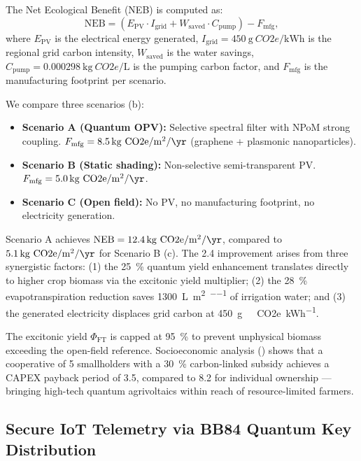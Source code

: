 \documentclass[twocolumn]{article}
\begin{document}
The Net Ecological Benefit (NEB) is computed as:
\begin{equation}
\mathrm{NEB} = \left( E_{\mathrm{PV}} \cdot I_{\mathrm{grid}} + W_{\mathrm{saved}} \cdot C_{\mathrm{pump}} \right) - F_{\mathrm{mfg}},
\label{eq:neb}
\end{equation}
where $E_{\mathrm{PV}}$ is the electrical energy generated, $I_{\mathrm{grid}} = \SI{450}{\g\ CO2e\per\kWh}$ is the regional grid carbon intensity, $W_{\mathrm{saved}}$ is the water savings, $C_{\mathrm{pump}} = \SI{0.000298}{\kg\ CO2e\per\L}$ is the pumping carbon factor, and $F_{\mathrm{mfg}}$ is the manufacturing footprint per scenario.

We compare three scenarios (b):
\begin{itemize}
\item \textbf{Scenario A (Quantum OPV):} Selective spectral filter with NPoM strong coupling. $F_{\mathrm{mfg}} = \SI{8.5}{\kg\ CO2e\per\m\squared\per\yr}$ (graphene + plasmonic nanoparticles).
\item \textbf{Scenario B (Static shading):} Non-selective semi-transparent PV. $F_{\mathrm{mfg}} = \SI{5.0}{\kg\ CO2e\per\m\squared\per\yr}$.
\item \textbf{Scenario C (Open field):} No PV, no manufacturing footprint, no electricity generation.
\end{itemize}

Scenario A achieves $\mathrm{NEB} = \SI{12.4}{\kg\ CO2e\per\m\squared\per\yr}$, compared to $\SI{5.1}{\kg\ CO2e\per\m\squared\per\yr}$ for Scenario B (c).
The \SI{2.4}{\times} improvement arises from three synergistic factors: (1) the \SI{25}{\percent} quantum yield enhancement translates directly to higher crop biomass via the excitonic yield multiplier; (2) the \SI{28}{\percent} evapotranspiration reduction saves \SI{1300}{\L\per\m\squared\per\yr} of irrigation water; and (3) the generated electricity displaces grid carbon at \SI{450}{\g\ CO2e\per\kWh}.

The excitonic yield $\Phi_{\mathrm{FT}}$ is capped at \SI{95}{\percent} to prevent unphysical biomass exceeding the open-field reference.
Socioeconomic analysis () shows that a cooperative of 5 smallholders with a \SI{30}{\percent} carbon-linked subsidy achieves a CAPEX payback period of \SI{3.5}{\yr}, compared to \SI{8.2}{\yr} for individual ownership --- bringing high-tech quantum agrivoltaics within reach of resource-limited farmers.

\subsection*{Secure IoT Telemetry via BB84 Quantum Key Distribution}
\end{document}
